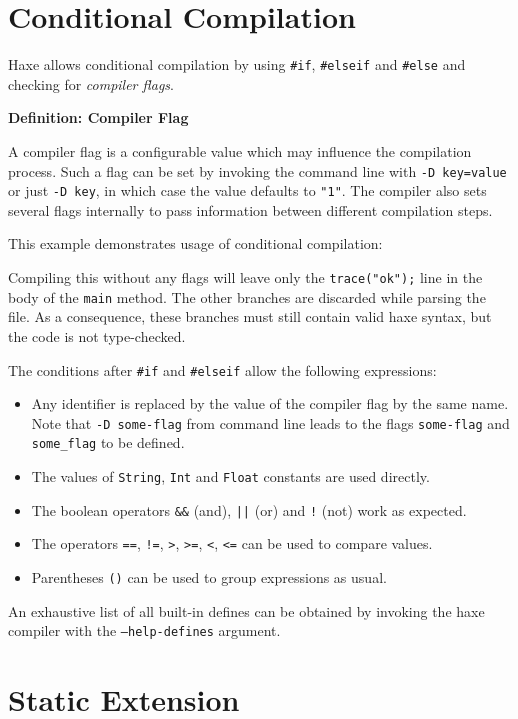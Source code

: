 \documentclass[a4paper,oneside]{book}
\newcommand{\type}[1]{\texttt{#1}}
\newcommand{\expr}[1]{\texttt{#1}}
\newenvironment{myshaded}
  {\def\FrameCommand{\fboxsep=\topsep\colorbox{bgcolor}}%
  \MakeFramed {\advance\hsize-\width \FrameRestore}}%
 {\endMakeFramed}
\newcommand{\define}[3][Definition]
	{\begin{myshaded}\noindent\textbf{#1: #2}\par\nobreak\noindent\ignorespaces#3\label{def:#2}\end{myshaded}}
\newcommand{\haxe}[2][]{%
}
\begin{document}
\section{Conditional Compilation}
\label{lf-condition-compliation}

Haxe allows conditional compilation by using \expr{\#if}, \expr{\#elseif} and \expr{\#else} and checking for \emph{compiler flags}.

\define{Compiler Flag}{A compiler flag is a configurable value which may influence the compilation process. Such a flag can be set by invoking the command line with \expr{-D key=value} or just \expr{-D key}, in which case the value defaults to \expr{"1"}. The compiler also sets several flags internally to pass information between different compilation steps.}

This example demonstrates usage of conditional compilation:

\haxe{assets/ConditionalCompilation.hx}
Compiling this without any flags will leave only the \expr{trace("ok");} line in the body of the \expr{main} method. The other branches are discarded while parsing the file. As a consequence, these branches must still contain valid haxe syntax, but the code is not type-checked.

The conditions after \expr{\#if} and \expr{\#elseif} allow the following expressions:

\begin{itemize}
	\item Any identifier is replaced by the value of the compiler flag by the same name. Note that \expr{-D some-flag} from command line leads to the flags \expr{some-flag} and \expr{some\_flag} to be defined.
	\item The values of \type{String}, \type{Int} and \type{Float} constants are used directly.
	\item The boolean operators \expr{\&\&} (and), \expr{||} (or) and \expr{!} (not) work as expected.
	\item The operators \expr{==}, \expr{!=}, \expr{>}, \expr{>=}, \expr{<}, \expr{<=} can be used to compare values.
	\item Parentheses \expr{()} can be used to group expressions as usual.
\end{itemize}
An exhaustive list of all built-in defines can be obtained by invoking the haxe compiler with the \expr{--help-defines} argument.


\section{Static Extension}
\label{lf-static-extension}
\end{document}
